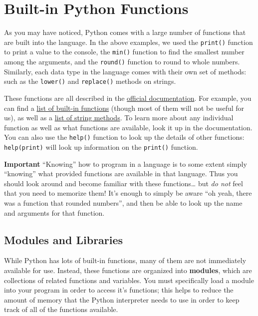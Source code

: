 \documentclass[]{book}
\begin{document}
\hypertarget{built-in-python-functions}{\section{Built-in Python
Functions}\label{built-in-python-functions}}

As you may have noticed, Python comes with a large number of functions
that are built into the language. In the above examples, we used the
\texttt{print()} function to print a value to the console, the
\texttt{min()} function to find the smallest number among the arguments,
and the \texttt{round()} function to round to whole numbers. Similarly,
each data type in the language comes with their own set of methods: such
as the \texttt{lower()} and \texttt{replace()} methods on strings.

These functions are all described in the
\href{https://docs.python.org/3/index.html}{official documentation}. For
example, you can find a
\href{https://docs.python.org/3/library/functions.html}{list of built-in
functions} (though most of them will not be useful for us), as well as a
\href{https://docs.python.org/3/library/stdtypes.html\#string-methods}{list
of string methods}. To learn more about any individual function as well
as what functions are available, look it up in the documentation. You
can also use the \texttt{help()} function to look up the details of
other functions: \texttt{help(print)} will look up information on the
\texttt{print()} function.

\textbf{Important} ``Knowing'' how to program in a language is to some
extent simply ``knowing'' what provided functions are available in that
language. Thus you should look around and become familiar with these
functions\ldots{} but \emph{do not} feel that you need to memorize them!
It's enough to simply be aware ``oh yeah, there was a function that
rounded numbers'', and then be able to look up the name and arguments
for that function.

\hypertarget{modules-and-libraries}{\subsection{Modules and
Libraries}\label{modules-and-libraries}}

While Python has lots of built-in functions, many of them are not
immediately available for use. Instead, these functions are organized
into \textbf{modules}, which are collections of related functions and
variables. You must specifically load a module into your program in
order to access it's functions; this helps to reduce the amount of
memory that the Python interpreter needs to use in order to keep track
of all of the functions available.
\end{document}
